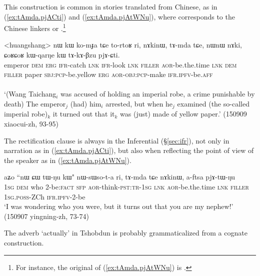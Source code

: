 This construction is common in stories translated from Chinese, as in (\ref{ex:tAmda.pjACti}) and (\ref{ex:tAmda.pjAtWNu}), where  corresponds to the Chinese linkers  or  .\footnote{For instance, the original of (\ref{ex:tAmda.pjAtWNu}) is . }  

\begin{exe}
\ex \label{ex:tAmda.pjACti}
\gll <huangshang> nɯ kɯ ko-mɟa tɕe to-rtoʁ ri, nɤkinɯ, tɤ-mda tɕe,  nɯnɯ nɤki, ɕoʁɕoʁ kɯ-qarŋe kɯ tɤ-kɤ-βzu pjɤ-ɕti. \\
emperor \textsc{dem} \textsc{erg} \textsc{ifr}-catch \textsc{lnk} \textsc{ifr}-look \textsc{lnk} \textsc{filler} \textsc{aor}-be.the.time \textsc{lnk} \textsc{dem} \textsc{filler} paper \textsc{sbj}:\textsc{pcp}-be.yellow \textsc{erg} \textsc{aor}-\textsc{obj}:\textsc{pcp}-make \textsc{ifr}.\textsc{ipfv}-be.\textsc{aff} \\
\\
\glt `(Wang Taichang$_i$ was accused of holding an imperial robe, a crime punishable by death) The emperor$_j$ (had) him$_i$ arrested, but when he$_j$ examined (the so-called imperial robe)$_k$ it turned out that it$_k$ was (just) made of yellow paper.' (150909 xiaocui-zh, 93-95)
\end{exe} 
 
 The rectification clause is always in the Inferential (§\ref{sec:ifr}), not only in narration as in (\ref{ex:tAmda.pjACti}), but also when reflecting the point of view of the speaker as in (\ref{ex:tAmda.pjAtWNu}).
 
\begin{exe}
\ex \label{ex:tAmda.pjAtWNu}
\gll  aʑo ``nɯ ɕɯ tɯ-ŋu kɯ" nɯ-sɯso-t-a ri,  tɤ-mda tɕe nɤkinɯ, a-ftsa pjɤ-tɯ-ŋu  \\
\textsc{1sg} \textsc{dem} who 2-be:\textsc{fact} \textsc{sfp} \textsc{aor}-think-\textsc{pst}:\textsc{tr}-\textsc{1sg} \textsc{lnk} \textsc{aor}-be.the.time \textsc{lnk} \textsc{filler} \textsc{1sg}.\textsc{poss}-ZCh \textsc{ifr}.\textsc{ipfv}-2-be \\
\glt `I was wondering who you were, but it turns out that you are my nephew!' (150907 yingning-zh, 73-74)
\end{exe} 

The adverb  `actually' in Tshobdun \citep[44;802]{jackson19tshobdun} is probably grammaticalized from a cognate construction.

